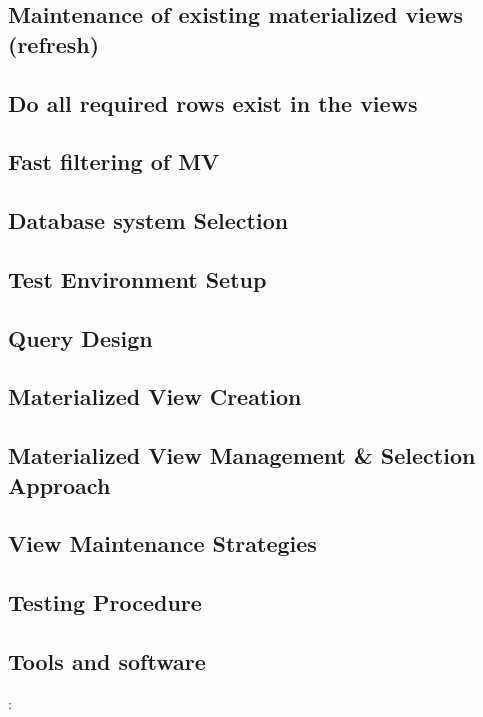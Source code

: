 \subsection{Maintenance of existing materialized views (refresh)
}
\subsection{Do all required rows exist in the views }
\subsection{Fast filtering of MV}

\subsection{Database system Selection}
\subsection{Test Environment Setup }
\subsection{Query Design}
\subsection{Materialized View Creation} 
\subsection{Materialized View Management \& Selection Approach}
\subsection{View Maintenance Strategies}
\subsection{Testing Procedure}
\subsection{Tools and software}: 